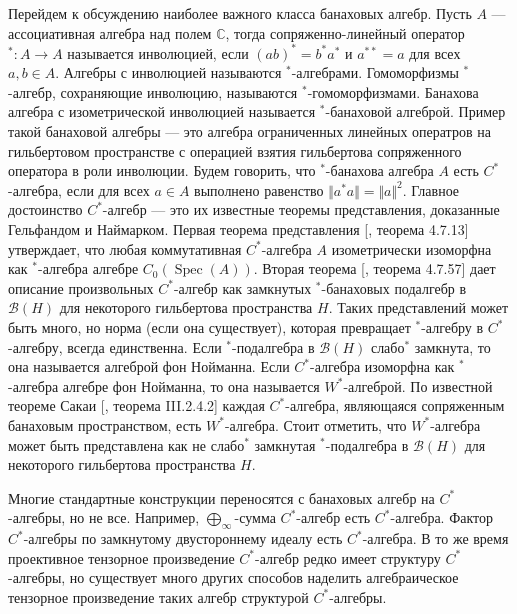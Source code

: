 Перейдем к обсуждению наиболее важного класса банаховых алгебр. Пусть $A$ ---
ассоциативная алгебра над полем $\mathbb{C}$, тогда сопряженно-линейный оператор
${}^*:A\to A$ называется инволюцией, если ${(ab)}^*=b^*a^*$ и $a^{**}=a$ для
всех $a,b\in A$. Алгебры с инволюцией называются ${}^*$-алгебрами. Гомоморфизмы
${}^*$-алгебр, сохраняющие инволюцию, называются ${}^*$-гомоморфизмами. Банахова
алгебра с изометрической инволюцией называется ${}^*$-банаховой алгеброй. Пример
такой банаховой алгебры --- это алгебра ограниченных линейных оператров на
гильбертовом пространстве с операцией взятия гильбертова сопряженного оператора
в роли инволюции. Будем говорить, что ${}^*$-банахова алгебра $A$ есть
$C^*$-алгебра, если для всех $a\in A$ выполнено равенство 
$\Vert a^*a\Vert=\Vert a\Vert^2$. 
Главное достоинство $C^*$-алгебр --- это их известные теоремы
представления, доказанные Гельфандом и Наймарком. Первая теорема представления
[\cite{HelBanLocConvAlg}, теорема 4.7.13] утверждает, что любая коммутативная
$C^*$-алгебра $A$ изометрически изоморфна как ${}^*$-алгебра алгебре
$C_0(\operatorname{Spec}(A))$. Вторая теорема [\cite{HelBanLocConvAlg}, теорема
4.7.57] дает описание произвольных $C^*$-алгебр как замкнутых ${}^*$-банаховых
подалгебр в $\mathcal{B}(H)$ для некоторого гильбертова пространства $H$. Таких
представлений может быть много, но норма (если она существует), которая
превращает ${}^*$-алгебру в $C^*$-алгебру, всегда единственна. Если
${}^*$-подалгебра в $\mathcal{B}(H)$ слабо${}^*$ замкнута, то она называется
алгеброй фон Нойманна. Если $C^*$-алгебра изоморфна как ${}^*$-алгебра алгебре
фон Нойманна, то она называется $W^*$-алгеброй. По известной теореме Сакаи
[\cite{BlackadarOpAlg}, теорема III.2.4.2] каждая $C^*$-алгебра, являющаяся
сопряженным банаховым пространством, есть $W^*$-алгебра. Стоит отметить, что
$W^*$-алгебра может быть представлена как не слабо${}^*$ замкнутая
${}^*$-подалгебра в $\mathcal{B}(H)$ для некоторого гильбертова пространства
$H$. 

Многие стандартные конструкции переносятся с банаховых алгебр на $C^*$-алгебры,
но не все. Например,  $\bigoplus_\infty$-сумма $C^*$-алгебр есть $C^*$-алгебра.
Фактор $C^*$-алгебры по замкнутому двустороннему идеалу есть $C^*$-алгебра. В то
же время проективное тензорное произведение $C^*$-алгебр редко имеет структуру
$C^*$-алгебры, но существует много других способов наделить алгебраическое
тензорное произведение таких алгебр структурой $C^*$-алгебры. 

